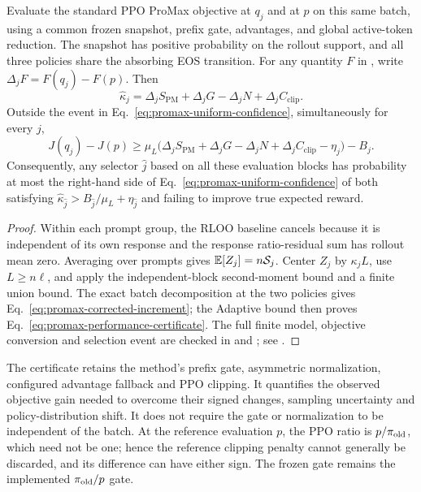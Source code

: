 \begin{theorem}
Evaluate the standard PPO ProMax objective at $q_j$ and at $p$ on this
same batch, using a common frozen snapshot, prefix gate, advantages, and
global active-token reduction. The snapshot has positive probability on the
rollout support, and all three policies share the absorbing EOS transition.
For any quantity $F$ in
, write $\Delta_jF=F(q_j)-F(p)$. Then
\begin{equation}
    \widehat\kappa_j
    =\Delta_j S_{\mathrm{PM}}+\Delta_jG-\Delta_jN+\Delta_j C_{\mathrm{clip}}.
    \label{eq:promax-corrected-increment}
\end{equation}
Outside the event in Eq.~\eqref{eq:promax-uniform-confidence}, simultaneously
for every $j$,
\begin{equation}
    J(q_j)-J(p)\ge
    \mu_L\bigl(\Delta_j S_{\mathrm{PM}}+\Delta_jG-\Delta_jN
                 +\Delta_j C_{\mathrm{clip}}-\eta_j\bigr)-B_j.
    \label{eq:promax-performance-certificate}
\end{equation}
Consequently, any selector $\hat j$ based on all these evaluation blocks
has probability at most the right-hand side of
Eq.~\eqref{eq:promax-uniform-confidence} of both satisfying
$\widehat\kappa_{\hat j}>B_{\hat j}/\mu_L+\eta_{\hat j}$ and failing to
improve true expected reward.
\end{theorem}

\begin{proof}
Within each prompt group, the RLOO baseline cancels because it is independent
of its own response and the response ratio-residual sum has rollout mean
zero. Averaging over prompts gives $\mathbb{E}[Z_j]=n\mathcal S_j$.
Center $Z_j$ by $\kappa_j L$, use $L\ge n\ell$, and apply the independent-block
second-moment bound and a finite union bound. The exact batch decomposition
at the two policies gives Eq.~\eqref{eq:promax-corrected-increment}; the
Adaptive bound then proves Eq.~\eqref{eq:promax-performance-certificate}.
The full finite model, objective conversion and selection event are checked
in  and
; see .
\end{proof}

The certificate retains the method's prefix gate, asymmetric normalization,
configured advantage fallback and PPO clipping. It quantifies the observed
objective gain needed to overcome their signed changes, sampling uncertainty
and policy-distribution shift. It does not require the gate or normalization
to be independent of the batch. At the reference evaluation $p$, the PPO
ratio is $p/\pi_{\mathrm{old}}$, which need not be one; hence the reference clipping
penalty cannot generally be discarded, and its difference can have either
sign. The frozen gate remains the implemented $\pi_{\mathrm{old}}/p$ gate.

